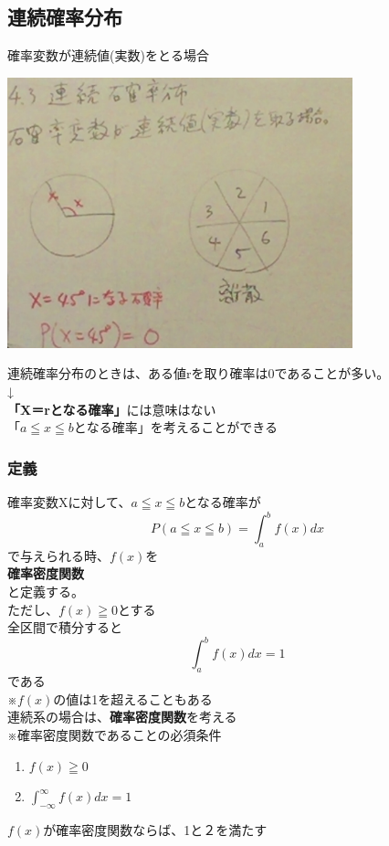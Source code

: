 \documentclass{jsarticle}
\begin{document}
	\subsection{連続確率分布}
	確率変数が連続値(実数)をとる場合
	\begin{center}
			\includegraphics[width=10cm]{10_19_4.JPG}
	\end{center}
	
	連続確率分布のときは、ある値rを取り確率は0であることが多い。\\
	↓\\
	{\bf{「X＝rとなる確率」}}には意味はない\\
	$「a≦x≦bとなる確率」$を考えることができる\\
	
	\subsubsection{定義}
		確率変数Xに対して、$a≦x≦b$となる確率が\\
		\[
 			P(a≦x≦b)= \int_a^b f(x) dx
		\]
		で与えられる時、$f(x)$を\\
		{\Large{\bf{確率密度関数}}}\\
		と定義する。\\
		ただし、$f(x)≧0$とする\\
		
		全区間で積分すると\\
		\[
			\int_a^b f(x) dx =1
		\]
		である\\
		※$f(x)$の値は1を超えることもある\\
		
		連続系の場合は、{\bf{確率密度関数}}を考える\\
		※確率密度関数であることの必須条件\\
		\begin{enumerate}
			\item $f(x) ≧ 0$
			\item $\int^∞_{-∞}f(x) dx =1$
		\end{enumerate}
		$f(x)$が確率密度関数ならば、1と２を満たす\\
		
\end{document}
